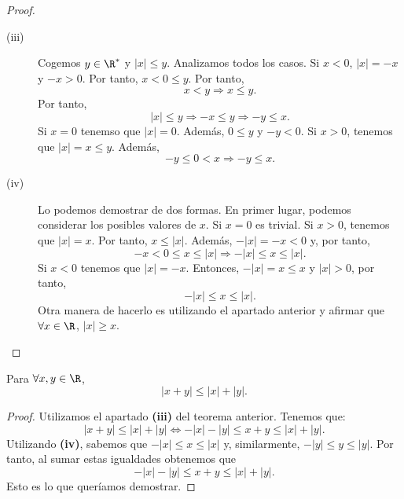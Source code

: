 \begin{proof}
\begin{description}
\item[(iii)] Cogemos $\displaystyle y \in \R^{*} $ y $\displaystyle \left|x\right|\leq y $. Analizamos todos los casos. Si $\displaystyle x<0 $, $\displaystyle \left|x\right| = - x $ y $\displaystyle - x > 0 $. Por tanto, $\displaystyle x < 0 \leq y $. Por tanto, 
	\[x < y \Rightarrow x \leq y .\]
Por tanto, 
\[ \left|x\right|\leq y \Rightarrow - x \leq y \Rightarrow - y \leq x .\]
Si $\displaystyle x = 0 $ tenemso que $\displaystyle \left|x\right|=0 $. Además, $\displaystyle 0 \leq y $ y $\displaystyle - y < 0 $.
Si $\displaystyle x>0 $, tenemos que $\displaystyle \left|x\right| = x \leq y $. Además, 
\[ - y \leq 0 < x \Rightarrow - y \leq x.\]
\item[(iv)] Lo podemos demostrar de dos formas. En primer lugar, podemos considerar los posibles valores de $\displaystyle x $. Si $\displaystyle x = 0 $ es trivial. Si $\displaystyle x>0 $, tenemos que $\displaystyle \left|x\right| = x $. Por tanto, $\displaystyle x \leq \left|x\right| $. Además, $\displaystyle -|x| = -x < 0 $ y, por tanto, 
	\[-x < 0 \leq x \leq \left|x\right| \Rightarrow -|x|\leq x \leq \left|x\right|.\]
Si $\displaystyle x < 0 $ tenemos que $\displaystyle \left|x\right| = - x $. Entonces, $\displaystyle - \left|x\right| = x \leq x $ y $\displaystyle \left|x\right| > 0 $, por tanto, 
\[- \left|x\right| \leq x \leq \left|x\right| .\]
Otra manera de hacerlo es utilizando el apartado anterior y afirmar que $\displaystyle \forall x \in \R $, $\displaystyle \left|x\right| \geq x $.
\end{description}
\end{proof}

\begin{ftheorem}
\normalfont Para $\displaystyle \forall x, y \in \R $, 
\[ \left|x + y\right|\leq \left|x\right| + \left|y\right| .\]
\end{ftheorem}

\begin{proof}
Utilizamos el apartado \textbf{(iii)} del teorema anterior. Tenemos que:
\[ \left|x + y\right| \leq \left|x\right|+ \left|y\right| \iff - \left|x\right| - \left|y\right| \leq x + y \leq \left|x\right| + \left|y\right| .\]
Utilizando \textbf{(iv)}, sabemos que $\displaystyle - \left|x\right| \leq x \leq \left|x\right|$ y, similarmente, $\displaystyle -|y| \leq y \leq \left|y\right| $. Por tanto, al sumar estas igualdades obtenemos que 
\[- \left|x\right| - \left|y\right| \leq x + y \leq \left|x\right| + \left|y\right| .\]
Esto es lo que queríamos demostrar.
\end{proof}

